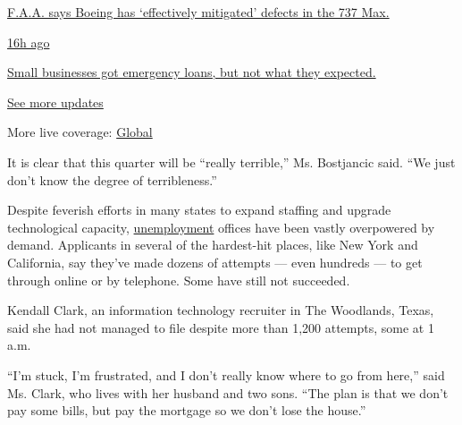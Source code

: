 \href{https://www.nytimes3xbfgragh.onion/live/2020/08/03/business/stock-market-today-coronavirus?action=click\&pgtype=Article\&state=default\&region=MAIN_CONTENT_1\&context=storylines_live_updates\#faa-says-boeing-has-effectively-mitigated-defects-in-the-737-max}{F.A.A.
says Boeing has `effectively mitigated' defects in the 737 Max.}

\href{https://www.nytimes3xbfgragh.onion/live/2020/08/03/business/stock-market-today-coronavirus?action=click\&pgtype=Article\&state=default\&region=MAIN_CONTENT_1\&context=storylines_live_updates\#small-businesses-got-emergency-loans-but-not-what-they-expected}{16h
ago}

\href{https://www.nytimes3xbfgragh.onion/live/2020/08/03/business/stock-market-today-coronavirus?action=click\&pgtype=Article\&state=default\&region=MAIN_CONTENT_1\&context=storylines_live_updates\#small-businesses-got-emergency-loans-but-not-what-they-expected}{Small
businesses got emergency loans, but not what they expected.}

\href{https://www.nytimes3xbfgragh.onion/live/2020/08/03/business/stock-market-today-coronavirus?action=click\&pgtype=Article\&state=default\&region=MAIN_CONTENT_1\&context=storylines_live_updates}{See
more updates}

More live coverage:
\href{https://www.nytimes3xbfgragh.onion/2020/08/04/world/coronavirus-covid-19.html?action=click\&pgtype=Article\&state=default\&region=MAIN_CONTENT_1\&context=storylines_live_updates}{Global}

It is clear that this quarter will be ``really terrible,'' Ms.
Bostjancic said. ``We just don't know the degree of terribleness.''

Despite feverish efforts in many states to expand staffing and upgrade
technological capacity,
\href{https://www.nytimes3xbfgragh.onion/2020/04/16/us/california-unemployment-edd-coronavirus.html}{unemployment}
offices have been vastly overpowered by demand. Applicants in several of
the hardest-hit places, like New York and California, say they've made
dozens of attempts --- even hundreds --- to get through online or by
telephone. Some have still not succeeded.

Kendall Clark, an information technology recruiter in The Woodlands,
Texas, said she had not managed to file despite more than 1,200
attempts, some at 1 a.m.

``I'm stuck, I'm frustrated, and I don't really know where to go from
here,'' said Ms. Clark, who lives with her husband and two sons. ``The
plan is that we don't pay some bills, but pay the mortgage so we don't
lose the house.''

